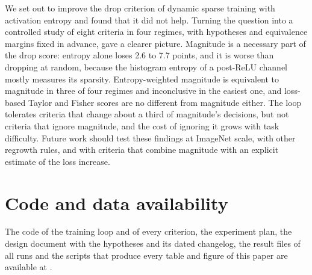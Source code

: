 We set out to improve the drop criterion of dynamic sparse training with activation entropy and found that it did not help. Turning the question into a controlled study of eight criteria in four regimes, with hypotheses and equivalence margins fixed in advance, gave a clearer picture. Magnitude is a necessary part of the drop score: entropy alone loses 2.6 to 7.7 points, and it is worse than dropping at random, because the histogram entropy of a post-ReLU channel mostly measures its sparsity. Entropy-weighted magnitude is equivalent to magnitude in three of four regimes and inconclusive in the easiest one, and loss-based Taylor and Fisher scores are no different from magnitude either. The loop tolerates criteria that change about a third of magnitude's decisions, but not criteria that ignore magnitude, and the cost of ignoring it grows with task difficulty. Future work should test these findings at ImageNet scale, with other regrowth rules, and with criteria that combine magnitude with an explicit estimate of the loss increase.

\section*{Code and data availability}

The code of the training loop and of every criterion, the experiment plan, the design document with the hypotheses and its dated changelog, the result files of all runs and the scripts that produce every table and figure of this paper are available at .
